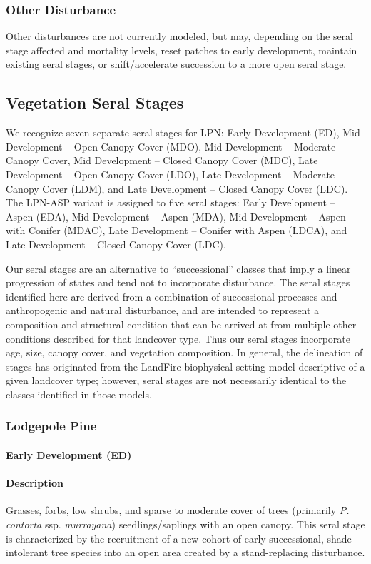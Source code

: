 \subsubsection{Other Disturbance}
Other disturbances are not currently modeled, but may, depending on the seral stage affected and mortality levels, reset patches to early development, maintain existing seral stages, or shift/accelerate succession to a more open seral stage. 

\subsection*{Vegetation Seral Stages}
We recognize seven separate seral stages for LPN: Early Development (ED), Mid Development – Open Canopy Cover (MDO), Mid Development – Moderate Canopy Cover, Mid Development – Closed Canopy Cover (MDC), Late Development – Open Canopy Cover (LDO), Late Development – Moderate Canopy Cover (LDM), and Late Development – Closed Canopy Cover (LDC). The LPN-ASP variant is assigned to five seral stages: Early Development – Aspen (EDA), Mid Development – Aspen (MDA), Mid Development – Aspen with Conifer (MDAC), Late Development – Conifer with Aspen (LDCA), and Late Development – Closed Canopy Cover (LDC).

Our seral stages are an alternative to ``successional'' classes that imply a linear progression of states and tend not to incorporate disturbance. The seral stages identified here are derived from a combination of successional processes and anthropogenic and natural disturbance, and are intended to represent a composition and structural condition that can be arrived at from multiple other conditions described for that landcover type. Thus our seral stages incorporate age, size, canopy cover, and vegetation composition. In general, the delineation of stages has originated from the LandFire biophysical setting model descriptive of a given landcover type; however, seral stages are not necessarily identical to the classes identified in those models.


\subsubsection{Lodgepole Pine}

\paragraph{Early Development (ED)}

\paragraph{Description} Grasses, forbs, low shrubs, and sparse to moderate cover of trees (primarily \emph{P. contorta} ssp. \emph{murrayana}) seedlings/saplings with an open canopy. This seral stage is characterized by the recruitment of a new cohort of early successional, shade-intolerant tree species into an open area created by a stand-replacing disturbance. 


